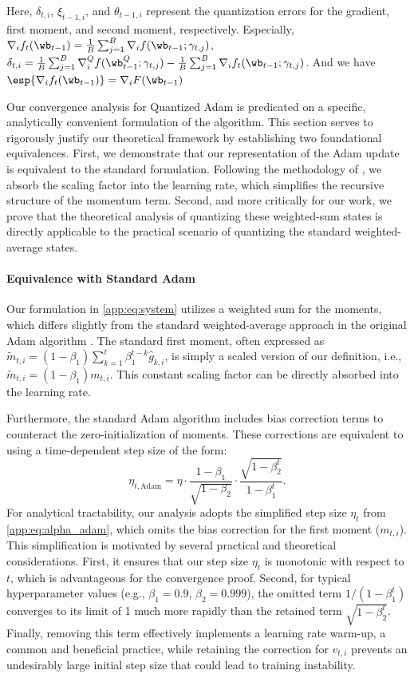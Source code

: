 \documentclass[11pt, letterpaper]{article}
\begin{document}
Here, $\delta_{t,i}$, $\xi_{t-1,i}$, and $\theta_{t-1,i}$ represent the quantization errors for the gradient, first moment, and second moment, respectively. Especially, $\nabla_i f_t(\wb_{t-1})=\frac{1}{B}\sum_{j=1}^B\nabla_if(\wb_{t-1};\gamma_{t,j})$, $\delta_{t,i}=\frac{1}{B}\sum_{j=1}^{B}\nabla_i^Q f(\wb_{t-1}^Q; \gamma_{t,j})-\frac{1}{B}\sum_{j=1}^B\nabla_if_t(\wb_{t-1};\gamma_{t,j})$. And we have $\esp{\nabla_if_t(\wb_{t-1})}=\nabla_iF(\wb_{t-1})$

Our convergence analysis for Quantized Adam is predicated on a specific, analytically convenient formulation of the algorithm. This section serves to rigorously justify our theoretical framework by establishing two foundational equivalences. First, we demonstrate that our representation of the Adam update is equivalent to the standard formulation. Following the methodology of \citet{defossez2022a}, we absorb the scaling factor into the learning rate, which simplifies the recursive structure of the momentum term. Second, and more critically for our work, we prove that the theoretical analysis of quantizing these weighted-sum states is directly applicable to the practical scenario of quantizing the standard weighted-average states. 

\paragraph{Equivalence with Standard Adam}
Our formulation in \eqref{app:eq:system} utilizes a weighted sum for the moments, which differs slightly from the standard weighted-average approach in the original Adam algorithm \citep{kingma2014adam}. The standard first moment, often expressed as $\tilde{m}_{t, i} = (1-\beta_1) \sum_{k=1}^{t}\beta_1^{t - k} \hat{g}_{k,i}$, is simply a scaled version of our definition, i.e., $\tilde{m}_{t,i} = (1 - \beta_1) m_{t,i}$. This constant scaling factor can be directly absorbed into the learning rate.

Furthermore, the standard Adam algorithm includes bias correction terms to counteract the zero-initialization of moments. These corrections are equivalent to using a time-dependent step size of the form:
\begin{equation}
    \label{eq:full_adam_step_size}
    \eta_{t, \text{Adam}} = \eta \cdot \frac{1 - \beta_1}{\sqrt{1 - \beta_2}} \cdot \frac{\sqrt{1 - \beta_2^t}}{1 - \beta_1^t}.
\end{equation}
For analytical tractability, our analysis adopts the simplified step size $\eta_t$ from \eqref{app:eq:alpha_adam}, which omits the bias correction for the first moment ($m_{t,i}$). This simplification is motivated by several practical and theoretical considerations. First, it ensures that our step size $\eta_t$ is monotonic with respect to $t$, which is advantageous for the convergence proof. Second, for typical hyperparameter values (e.g., $\beta_1=0.9$, $\beta_2=0.999$), the omitted term $1/(1-\beta_1^t)$ converges to its limit of 1 much more rapidly than the retained term $\sqrt{1 - \beta_2^t}$. Finally, removing this term effectively implements a learning rate warm-up, a common and beneficial practice, while retaining the correction for $v_{t,i}$ prevents an undesirably large initial step size that could lead to training instability.
\end{document}
